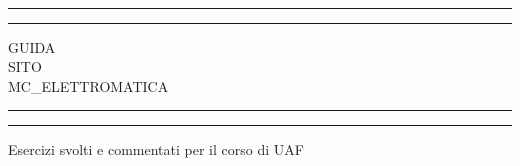  \begin{titlepage}
    
\centering %
\scshape %
    
\begin{minipage}[c]{0.45\textwidth}
    \begin{flushleft}
       
    \end{flushleft}
\end{minipage}
\hfill
\begin{minipage}[c]{0.45\textwidth}
    \begin{flushright}

    \end{flushright}
\end{minipage}\\
\medskip
{}

    
    \rule{\textwidth}{1.6pt}\vspace*{-\baselineskip}\vspace*{2pt} %
    \rule{\textwidth}{0.4pt} %
    
    \vspace{0.75\baselineskip} %
    
    {\LARGE GUIDA\\ SITO\\ MC\_ELETTROMATICA\\} %
    
    \vspace{0.75\baselineskip} %
    
    \rule{\textwidth}{0.4pt}\vspace*{-\baselineskip}\vspace{3.2pt} %
    \rule{\textwidth}{1.6pt} %
    
    \vspace{2\baselineskip} %
    
    Esercizi svolti e commentati per il corso di UAF %
    
    \vspace*{3\baselineskip} %
    

\end{titlepage}
